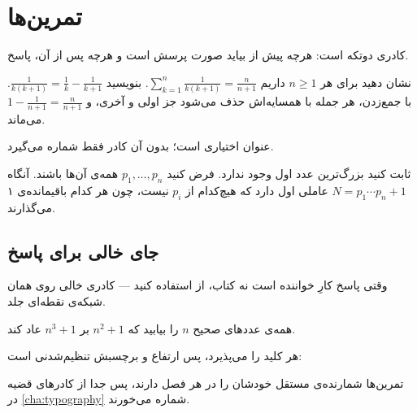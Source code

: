 \section{تمرین‌ها}

 کادری دوتکه است: هرچه پیش از 
بیاید صورت پرسش است و هرچه پس از آن، پاسخ.

\begin{exercise}
نشان دهید برای هر $n \geq 1$ داریم
$\sum_{k=1}^{n} \frac{1}{k(k+1)} = \frac{n}{n+1}$.
\tcblower
بنویسید $\frac{1}{k(k+1)} = \frac{1}{k} - \frac{1}{k+1}$. با جمع‌زدن، هر جمله
با همسایه‌اش حذف می‌شود جز اولی و آخری، و
$1 - \frac{1}{n+1} = \frac{n}{n+1}$ می‌ماند.
\end{exercise}

عنوان اختیاری است؛ بدون آن کادر فقط شماره می‌گیرد.

\begin{exercise}
ثابت کنید بزرگ‌ترین عدد اول وجود ندارد.
\tcblower
فرض کنید $p_1, \dots, p_n$ همه‌ی آن‌ها باشند. آنگاه $N = p_1 \cdots p_n + 1$
عاملی اول دارد که هیچ‌کدام از $p_i$ نیست، چون هر کدام باقیمانده‌ی ۱ می‌گذارند.
\end{exercise}

\subsection{جای خالی برای پاسخ}

وقتی پاسخ کارِ خواننده است نه کتاب، از 
استفاده کنید — کادری خالی روی همان شبکه‌ی نقطه‌ای جلد.

\begin{exercise}
همه‌ی عددهای صحیح $n$ را بیابید که $n^2 + 1$ بر $n^3 + 1$ عاد کند.
\end{exercise}

\workspace

هر کلید  را می‌پذیرد، پس ارتفاع و برچسبش تنظیم‌شدنی
است:

\workspace[height=22mm, wslabel=محل کار]

\begin{note}
تمرین‌ها شمارنده‌ی مستقل خودشان را در هر فصل دارند، پس جدا از کادرهای قضیه در
\cref{cha:typography} شماره می‌خورند.
\end{note}
